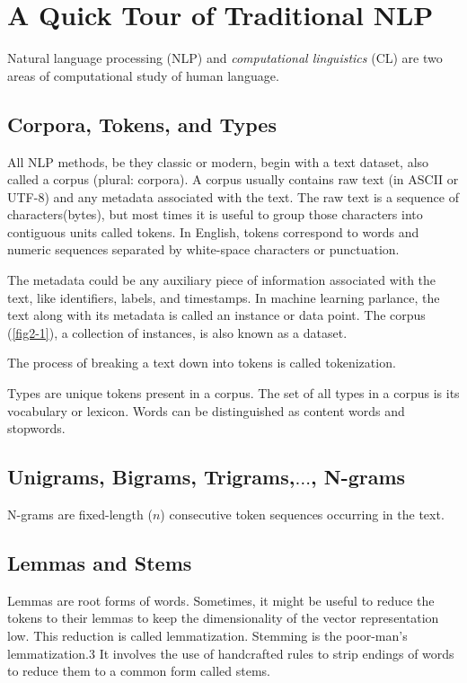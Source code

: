 \chapter{A Quick Tour of Traditional NLP\label{Ch02}}
Natural language processing (NLP) and \textit{computational linguistics} (CL) are two areas of computational study of human language.
\section{Corpora, Tokens, and Types}
All NLP methods, be they classic or modern, begin with a text dataset, also called a corpus (plural: corpora). A corpus usually contains raw text (in ASCII or UTF-8) and any metadata associated with the text. The raw text is a sequence of characters(bytes), but most times it is useful to group those characters into contiguous units called tokens. In English, tokens correspond to words and numeric sequences separated by white-space characters or punctuation.

The metadata could be any auxiliary piece of information associated with the text, like identifiers, labels, and timestamps. In machine learning parlance, the text along with its metadata is called an instance or data point. The corpus (\autoref{fig2-1}), a collection of instances, is also known as a dataset.


The process of breaking a text down into tokens is called tokenization.

Types are unique tokens present in a corpus. The set of all types in a corpus is its
vocabulary or lexicon. Words can be distinguished as content words and stopwords.

\section{Unigrams, Bigrams, Trigrams,$\dots$, N-grams}
N-grams are fixed-length ($n$) consecutive token sequences occurring in the text.

\section{Lemmas and Stems}
Lemmas are root forms of words. Sometimes, it might be useful to reduce the
tokens to their lemmas to keep the dimensionality of the vector representation low. This reduction is called lemmatization. Stemming is the poor-man's lemmatization.3 It involves the use of handcrafted rules
to strip endings of words to reduce them to a common form called stems.

